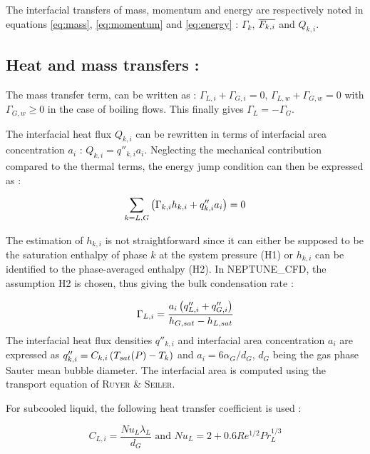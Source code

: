 The interfacial transfers of mass, momentum and energy are respectively noted in equations \ref{eq:mass}, \ref{eq:momentum} and \ref{eq:energy} : $\Gamma_{k}$, $\overline{F_{k,i}}$ and $Q_{k,i}$.

\subsection{Heat and mass transfers :}


The mass transfer term, can be written as : $\Gamma_{L,i} + \Gamma_{G,i} = 0$, $\Gamma_{L,w} + \Gamma_{G,w} = 0$ with $\Gamma_{G,w} \geq 0$ in the case of boiling flows. This finally gives $\Gamma_{L}=-\Gamma_{G}$.

The interfacial heat flux $Q_{k,i}$ can be rewritten in terms of interfacial area concentration $a_{i}$ : $Q_{k,i}=q''_{k,i}a_{i}$. Neglecting the mechanical contribution compared to the thermal terms, the energy jump condition can then be expressed as :

\begin{equation}
\label{eq:energy_jump}
\sum_{k=L,G}\left( \Gamma_{k,i}h_{k,i} + q''_{k,i}a_{i} \right)=0
\end{equation}

The estimation of $h_{k,i}$ is not straightforward since it can either be supposed to be the saturation enthalpy of phase $k$ at the system pressure (H1) or $h_{k,i}$ can be identified to the phase-averaged enthalpy (H2). In NEPTUNE\_CFD, the assumption H2 is chosen, thus giving the bulk condensation rate :

\begin{equation}
\label{eq:condensation_rate}
\Gamma_{L,i}=\frac{a_{i}\left( q''_{L,i}+q''_{G,i} \right)}{h_{G,sat}-h_{L,sat}}
\end{equation}
The interfacial heat flux densities $q''_{k,i}$ and interfacial area concentration $a_{i}$ are expressed as $q''_{k,i}=C_{k,i}\left( T_{sat}(P)-T_{k} \right)$ and $a_{i}=6 \alpha_{G}/d_{G}$, $d_{G}$ being the gas phase Sauter mean bubble diameter. The interfacial area is computed using the transport equation of \textsc{Ruyer} \& \textsc{Seiler}\cite{Ruyer2009}.

For subcooled liquid, the following heat transfer coefficient is used \cite{Manon2000}:

\begin{equation}
\label{eq:subcooled_HT}
C_{L,i}=\frac{Nu_{L}\lambda_{L}}{d_{G}} \text{ and } Nu_{L}=2+0.6Re^{1/2}Pr_{L}^{1/3}
\end{equation}

